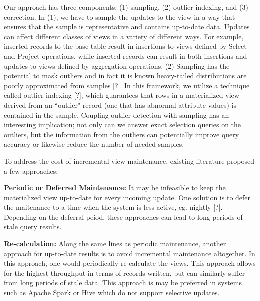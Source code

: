 Our approach has three components: (1) sampling, (2) outlier indexing, and (3) correction. In (1), we have to sample the updates to the view in a way that ensures that the sample is representative and contains up-to-date data. Updates can affect different classes of views in a variety of different ways. For example, inserted records to the base table result in insertions to views defined by Select and Project operations, while inserted records can result in both insertions and updates to views defined by aggregation operations. (2) Sampling has the potential to mask outliers and in fact it is known
heavy-tailed distributions are poorly approximated from samples {[}?{]}.
In this framework, we utilize a technique called outlier indexing [?], which guarantees that rows in a materialized view derived from an ``outlier" record (one that has abnormal attribute values) is contained in the sample.
Coupling outlier detection with sampling has an interesting implication; not only can we answer exact selection queries on the outliers, but
the information from the outliers can potentially improve query accuracy or likewise reduce the number of needed samples.

To address the cost of incremental view maintenance, existing literature proposed a few approaches: 
\vspace{1em}

\noindent\textbf{Periodic or Deferred Maintenance: }
It may be infeasible to keep the materialized view up-to-date for every incoming update.
One solution is to defer the maitenance to a time when the system is less active, eg. nightly [?].
Depending on the deferral peiod, these approaches can lead to long periods of stale query results.

\vspace{1em}

\noindent\textbf{Re-calculation: }
Along the same lines as periodic maintenance, another approach 
for up-to-date results is to avoid incremental maintenance altogether.
In this approach, one would periodically re-calculate the views.
This approach allows for the highest throughput in terms of records written, but can
similarly suffer from long periods of stale data.
This approach is may be preferred in systems such as Apache Spark or Hive which do not support
selective updates. 

\vspace{1em}

